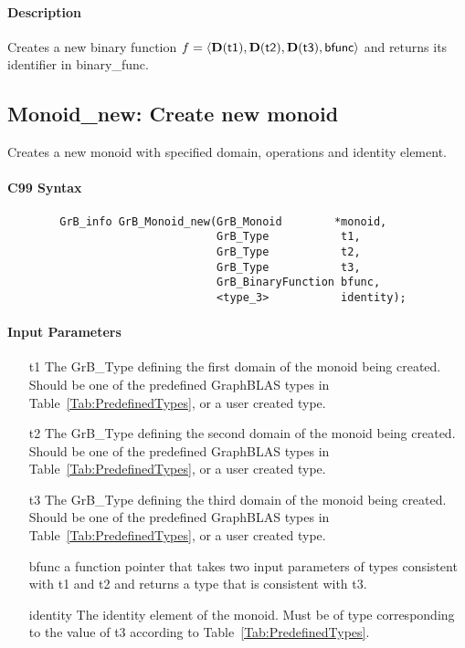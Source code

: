 \paragraph{Description}

Creates a new binary function $f = \langle \bold{D}({\sf t1}), \bold{D}({\sf t2}),
 \bold{D}({\sf t3}), {\sf bfunc} \rangle$ and returns its identifier in {\sf binary\_func}.


\subsection{{\sf Monoid\_new}: Create new monoid}

Creates a new monoid with specified domain, operations and identity element.

\paragraph{C99 Syntax}

\begin{verbatim}
        GrB_info GrB_Monoid_new(GrB_Monoid        *monoid,
                                GrB_Type           t1,
                                GrB_Type           t2,
                                GrB_Type           t3,
                                GrB_BinaryFunction bfunc,
                                <type_3>           identity);
\end{verbatim}

\paragraph{Input Parameters}

\begin{itemize}[leftmargin=1.1in]
    \item[{\sf t1}] The {\sf GrB\_Type} defining the first domain of the monoid being created. 
    Should be one of the predefined
    GraphBLAS types in Table~\ref{Tab:PredefinedTypes}, or a user created type.
    \item[{\sf t2}] The {\sf GrB\_Type} defining the second domain of the monoid being
     created. Should be one of the predefined
    GraphBLAS types in Table~\ref{Tab:PredefinedTypes}, or a user created type.
    \item[{\sf t3}] The {\sf GrB\_Type} defining the third domain of the monoid being created. 
    Should be one of the predefined
    GraphBLAS types in Table~\ref{Tab:PredefinedTypes}, or a user created type.
    \item[{\sf bfunc}] a function pointer that takes two input parameters of types consistent
    with t1 and t2 and returns a type that is consistent with t3.
    \item[{\sf identity}] The identity element of the monoid. 
    Must be of type corresponding to the value of {\sf t3} according to
    Table~\ref{Tab:PredefinedTypes}.
\end{itemize}

